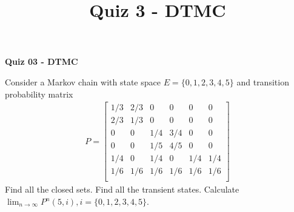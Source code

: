 \documentclass[a4paper,11pt,english]{article}
\title{Quiz 3 - DTMC}
\author{}
\begin{document}
\begin{center}
\textbf{Quiz 03 - DTMC}
\end{center}
Consider a Markov chain with state space $E = \{0,1,2,3,4,5\}$ and transition probability matrix
\begin{align*}
	P = 
\begin{bmatrix}
	1/3      & 2/3 & 0 & 0 & 0 & 0 \\
    2/3      & 1/3 & 0 & 0 & 0 & 0 \\
	0      & 0 & 1/4 & 3/4 & 0 & 0 \\
    0      & 0 & 1/5 & 4/5 & 0 & 0\\
    1/4      & 0 & 1/4 & 0 & 1/4 & 1/4 \\
    1/6      & 1/6 & 1/6 & 1/6 & 1/6 & 1/6 \\
\end{bmatrix}
\end{align*}
Find all the closed sets. Find all the transient states. Calculate $\lim_{n \rightarrow \infty} P^n(5,i), i=\{0,1,2,3,4,5\}$.
\end{document}
